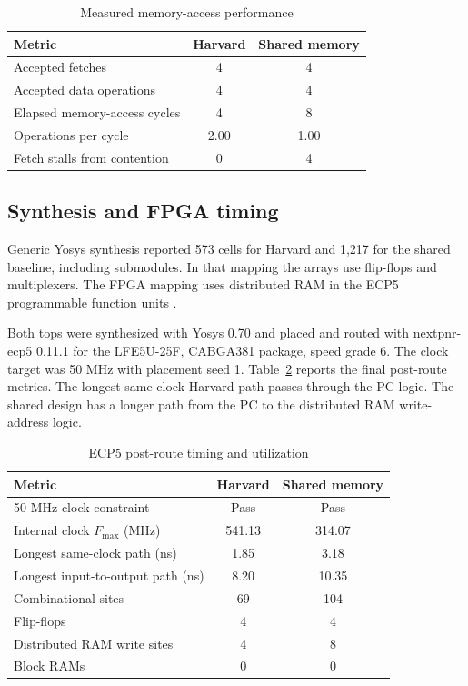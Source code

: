\documentclass[conference]{IEEEtran}
\begin{document}
\begin{table}[!t]
\caption{Measured memory-access performance}
\label{tab:performance}
\centering
\footnotesize
\setlength{\tabcolsep}{4pt}
\begin{tabular}{lcc}
\hline
Metric & Harvard & Shared memory\\
\hline
Accepted fetches & 4 & 4\\
Accepted data operations & 4 & 4\\
Elapsed memory-access cycles & 4 & 8\\
Operations per cycle & 2.00 & 1.00\\
Fetch stalls from contention & 0 & 4\\
\hline
\end{tabular}
\end{table}

\subsection{Synthesis and FPGA timing}
Generic Yosys synthesis reported 573 cells for Harvard and 1,217 for the shared baseline, including submodules. In that mapping the arrays use flip-flops and multiplexers. The FPGA mapping uses distributed RAM in the ECP5 programmable function units \cite{lattice}.

Both tops were synthesized with Yosys 0.70 and placed and routed with nextpnr-ecp5 0.11.1 for the LFE5U-25F, CABGA381 package, speed grade 6. The clock target was 50 MHz with placement seed 1. Table~\ref{tab:timing} reports the final post-route metrics. The longest same-clock Harvard path passes through the PC logic. The shared design has a longer path from the PC to the distributed RAM write-address logic.

\begin{table}[!t]
\caption{ECP5 post-route timing and utilization}
\label{tab:timing}
\centering
\footnotesize
\setlength{\tabcolsep}{4pt}
\begin{tabular}{lcc}
\hline
Metric & Harvard & Shared memory\\
\hline
50 MHz clock constraint & Pass & Pass\\
Internal clock \(F_{\max}\) (MHz) & 541.13 & 314.07\\
Longest same-clock path (ns) & 1.85 & 3.18\\
Longest input-to-output path (ns) & 8.20 & 10.35\\
Combinational sites & 69 & 104\\
Flip-flops & 4 & 4\\
Distributed RAM write sites & 4 & 8\\
Block RAMs & 0 & 0\\
\hline
\end{tabular}
\end{table}
\end{document}
